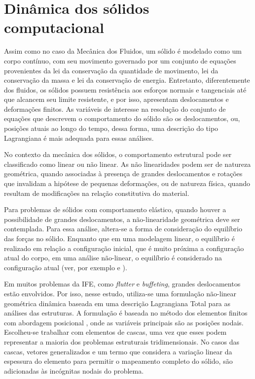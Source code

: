 \documentclass[tese_patricia]{subfiles}
\begin{document}
\chapter[Dinâmica dos sólidos computacional]{Dinâmica dos sólidos computacional} \label{capitulo:Cap4}

Assim como no caso da Mecânica dos Fluidos, um sólido é modelado como um corpo contínuo, com seu movimento governado por um conjunto de equações provenientes da lei da conservação da quantidade de movimento, lei da conservação da massa e lei da conservação de energia. Entretanto, diferentemente dos fluidos, os sólidos possuem resistência aos esforços normais e tangenciais até que alcancem seu limite resistente, e por isso, apresentam deslocamentos e deformações finitos. As variáveis de interesse na resolução do conjunto de equações que descrevem o comportamento do sólido são os deslocamentos, ou, posições atuais ao longo do tempo, dessa forma, uma descrição do tipo Lagrangiana é mais adequada para essas análises.

No contexto da mecânica dos sólidos, o comportamento estrutural pode ser classificado como linear ou não linear. As não linearidades podem ser de natureza geométrica, quando associadas à presença de grandes deslocamentos e rotações que invalidam a hipótese de pequenas deformações, ou de natureza física, quando resultam de modificações na relação constitutiva do material.

Para problemas de sólidos com comportamento elástico, quando houver a possibilidade de grandes deslocamentos, a não-linearidade geométrica deve ser contemplada. Para essa análise, altera-se a forma de consideração do equilíbrio das forças no sólido. Enquanto que em uma modelagem linear, o equilíbrio é realizado em relação a configuração inicial, que é muito próxima a configuração atual do corpo, em uma análise não-linear, o equilíbrio é considerado na configuração atual (ver, por exemplo  e ).

Em muitos problemas da IFE, como \textit{flutter} e \textit{buffeting}, grandes deslocamentos estão envolvidos. Por isso, nesse estudo, utiliza-se uma formulação não-linear geométrica dinâmica baseada em uma descrição Lagrangiana Total para as análises das estruturas. A formulação é baseada no método dos elementos finitos com abordagem posicional \cite{Coda:2003,Coda:2018}, onde as variáveis principais são as posições nodais. Escolheu-se trabalhar com elementos de cascas, uma vez que esses podem representar a maioria dos problemas estruturais tridimensionais. No casos das cascas, vetores generalizados e um termo que considera a variação linear da espessura do elemento para permitir o mapeamento completo do sólido, são adicionadas às incógnitas nodais do problema. 
\end{document}

